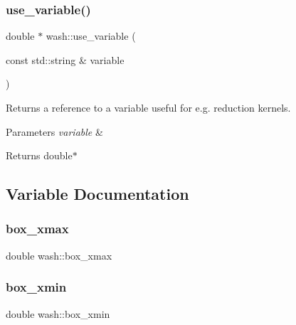 \mbox{\label{namespacewash_ad9a1f6575e74c6c12ddbae8d58c2b478}} 
\subsubsection{\texorpdfstring{use\+\_\+variable()}{use\_variable()}}
{\footnotesize\ttfamily double $\ast$ wash\+::use\+\_\+variable (\begin{DoxyParamCaption}\item[{const std\+::string \&}]{variable }\end{DoxyParamCaption})}



Returns a reference to a variable useful for e.\+g. reduction kernels. 


\begin{DoxyParams}{Parameters}
{\em variable} & \\
\hline
\end{DoxyParams}
\begin{DoxyReturn}{Returns}
double$\ast$ 
\end{DoxyReturn}


\subsection{Variable Documentation}
\mbox{\label{namespacewash_ad5a717b6958f5b958fdc4095a379bbc1}} 
\subsubsection{\texorpdfstring{box\+\_\+xmax}{box\_xmax}}
{\footnotesize\ttfamily double wash\+::box\+\_\+xmax}

\mbox{\label{namespacewash_a5594c5b6d88e52502a105679e9dce1e5}} 
\subsubsection{\texorpdfstring{box\+\_\+xmin}{box\_xmin}}
{\footnotesize\ttfamily double wash\+::box\+\_\+xmin}

\mbox{\label{namespacewash_a8c0da9131f4544d469602bc9f38aaa04}} 
